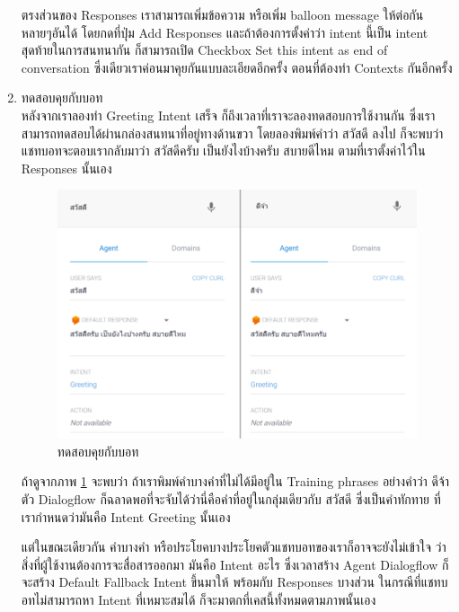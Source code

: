 \begin{enumerate}[label=\arabic*)]
ตรงส่วนของ Responses เราสามารถเพิ่มข้อความ หรือเพิ่ม balloon message ให้ต่อกันหลายๆอันได้ โดยกดที่ปุ่ม Add Responses และถ้าต้องการตั้งค่าว่า intent นี้เป็น intent สุดท้ายในการสนทนากัน ก็สามารถเปิด Checkbox Set this intent as end of conversation ซึ่งเดียวเราค่อนมาคุยกันแบบละเอียดอีกครั้ง ตอนที่ต้องทำ Contexts กันอีกครั้ง

\item ทดสอบคุยกับบอท \\
หลังจากเราลองทำ Greeting Intent เสร็จ ก็ถึงเวลาที่เราจะลองทดสอบการใช้งานกัน ซึ่งเราสามารถทดสอบได้ผ่านกล่องสนทนาที่อยู่ทางด้านขวา โดยลองพิมพ์คำว่า สวัสดี ลงไป ก็จะพบว่าแชทบอทจะตอบเรากลับมาว่า สวัสดีครับ เป็นยังไงบ้างครับ สบายดีไหม ตามที่เราตั้งค่าไว้ใน Responses นั้นเอง

	\begin{figure}[H]
		\centering
		\includegraphics[width=0.9\columnwidth]{Figures/2/dialogflow_5}
		\caption{ทดสอบคุยกับบอท}
		\label{Fig:dialogflow5}
	\end{figure}

ถ้าดูจากภาพ \ref{Fig:dialogflow5} จะพบว่า ถ้าเราพิมพ์คำบางคำที่ไม่ได้มีอยู่ใน Training phrases อย่างคำว่า ดีจ้า ตัว Dialogflow ก็ฉลาดพอที่จะจับได้ว่านี่คือคำที่อยู่ในกลุ่มเดียวกับ สวัสดี ซึ่งเป็นคำทักทาย ที่เรากำหนดว่ามันคือ Intent Greeting นั้นเอง

แต่ในขณะเดียวกัน คำบางคำ หรือประโยคบางประโยคตัวแชทบอทของเราก็อาจจะยังไม่เข้าใจ ว่าสิ่งที่ผู้ใช้งานต้องการจะสื่อสารออกมา มันคือ Intent อะไร ซึ่งเวลาสร้าง Agent Dialogflow ก็จะสร้าง Default Fallback Intent ขึ้นมาให้ พร้อมกับ Responses บางส่วน ในกรณีที่แชทบอทไม่สามารถหา Intent ที่เหมาะสมได้ ก็จะมาตกที่เคสนี้ทั้งหมดตามภาพนั้นเอง


\end{enumerate}
